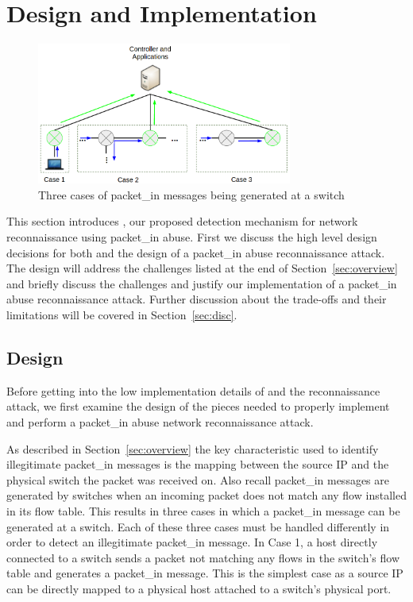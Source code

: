\section{Design and Implementation}
\label{sec:design}

\begin{figure}[t] 
  \centering 
  \includegraphics[width=3.3in]{img/cases.png}
  \caption{Three cases of packet\_in messages being generated at a
  switch} 
  \label{fig:cases}
\end{figure}

This section introduces \name, our proposed detection mechanism for 
network reconnaissance using packet\_in abuse. First we discuss the 
high level design decisions for both \name and the design of a 
packet\_in abuse reconnaissance attack. The design will address the
challenges listed at the end of Section~\ref{sec:overview} and 
briefly discuss the challenges and justify our implementation of a 
packet\_in abuse reconnaissance attack. Further discussion about
the trade-offs and their limitations will be covered in
Section~\ref{sec:disc}.

\subsection{Design}

Before getting into the low implementation details of \name and
the reconnaissance attack, we first examine the design of the pieces 
needed to properly implement \name and perform a packet\_in abuse 
network reconnaissance attack.

\myparagraph{\name} As described in Section~\ref{sec:overview} the key
characteristic used to identify illegitimate packet\_in messages is the
mapping between the source IP and the physical switch the packet was 
received on. Also recall packet\_in messages are generated by switches
when an incoming packet does not match any flow installed in its flow
table. This results in three cases in which a packet\_in message can be
generated at a switch. Each of these three cases  must be handled 
differently in order to detect an illegitimate packet\_in message. In 
Case 1, a host directly connected to a switch sends a packet not matching
any flows in the switch's flow table and generates a packet\_in message.
This is the simplest case as a source IP can be directly mapped to a
physical host attached to a switch's physical port. 

